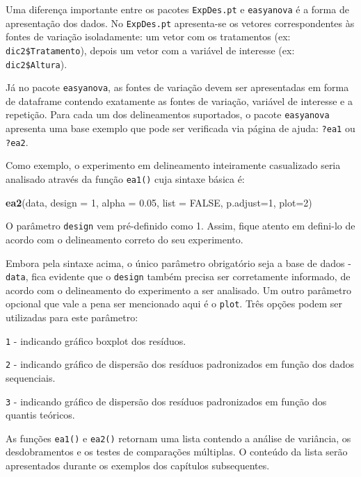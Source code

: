\documentclass[
]{article}
\newenvironment{Shaded}{\begin{snugshade}}{\end{snugshade}}
\newcommand{\DataTypeTok}[1]{\textcolor[rgb]{0.13,0.29,0.53}{#1}}
\newcommand{\DecValTok}[1]{\textcolor[rgb]{0.00,0.00,0.81}{#1}}
\newcommand{\FloatTok}[1]{\textcolor[rgb]{0.00,0.00,0.81}{#1}}
\newcommand{\KeywordTok}[1]{\textcolor[rgb]{0.13,0.29,0.53}{\textbf{#1}}}
\newcommand{\NormalTok}[1]{#1}
\newcommand{\OtherTok}[1]{\textcolor[rgb]{0.56,0.35,0.01}{#1}}
\begin{document}
Uma diferença importante entre os pacotes \texttt{ExpDes.pt} e \texttt{easyanova} é a forma de apresentação dos dados. No \texttt{ExpDes.pt} apresenta-se os vetores correspondentes às fontes de variação isoladamente: um vetor com os tratamentos (ex: \texttt{dic2\$Tratamento}), depois um vetor com a variável de interesse (ex: \texttt{dic2\$Altura}).

Já no pacote \texttt{easyanova}, as fontes de variação devem ser apresentadas em forma de dataframe contendo exatamente as fontes de variação, variável de interesse e a repetição. Para cada um dos delineamentos suportados, o pacote \texttt{easyanova} apresenta uma base exemplo que pode ser verificada via página de ajuda: \texttt{?ea1} ou \texttt{?ea2}.

Como exemplo, o experimento em delineamento inteiramente casualizado seria analisado através da função \texttt{ea1()} cuja sintaxe básica é:

\begin{Shaded}
\begin{Highlighting}[]
\KeywordTok{ea2}\NormalTok{(data, }\DataTypeTok{design =} \DecValTok{1}\NormalTok{, }\DataTypeTok{alpha =} \FloatTok{0.05}\NormalTok{, }\DataTypeTok{list =} \OtherTok{FALSE}\NormalTok{, }\DataTypeTok{p.adjust=}\DecValTok{1}\NormalTok{, }\DataTypeTok{plot=}\DecValTok{2}\NormalTok{)}
\end{Highlighting}
\end{Shaded}

O parâmetro \texttt{design} vem pré-definido como 1. Assim, fique atento em defini-lo de acordo com o delineamento correto do seu experimento.

Embora pela sintaxe acima, o único parâmetro obrigatório seja a base de dados - \texttt{data}, fica evidente que o \texttt{design} também precisa ser corretamente informado, de acordo com o delineamento do experimento a ser analisado. Um outro parâmetro opcional que vale a pena ser mencionado aqui é o \texttt{plot}. Três opções podem ser utilizadas para este parâmetro:

\texttt{1} - indicando gráfico boxplot dos resíduos.

\texttt{2} - indicando gráfico de dispersão dos resíduos padronizados em função dos dados sequenciais.

\texttt{3} - indicando gráfico de dispersão dos resíduos padronizados em função dos quantis teóricos.

As funções \texttt{ea1()} e \texttt{ea2()} retornam uma lista contendo a análise de variância, os desdobramentos e os testes de comparações múltiplas. O conteúdo da lista serão apresentados durante os exemplos dos capítulos subsequentes.
\end{document}

